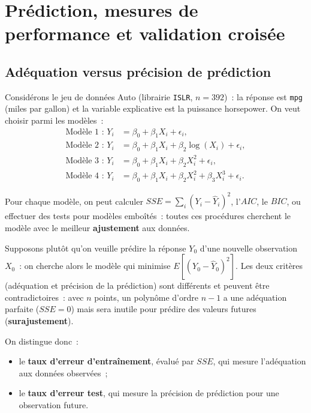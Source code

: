\documentclass[11pt,letterpaper]{article}
\begin{document}
\newpage
\section{Prédiction, mesures de performance et validation croisée}
\label{sec:cv}

\subsection{Adéquation versus précision de prédiction}

Considérons le jeu de données \textsf{Auto} (librairie \texttt{ISLR}, $n = 392$)~: la réponse est \texttt{mpg} (miles par gallon) et la variable explicative est la puissance \textsf{horsepower}. On veut choisir parmi les modèles~:
\begin{align*}
\mbox{Modèle 1~: } Y_i &= \beta_0 + \beta_1 X_i + \epsilon_i,\\
\mbox{Modèle 2~: } Y_i &= \beta_0 + \beta_1 X_i + \beta_2\log(X_i) + \epsilon_i,\\
\mbox{Modèle 3~: } Y_i &= \beta_0 + \beta_1 X_i + \beta_2 X_i^2 + \epsilon_i,\\
\mbox{Modèle 4~: } Y_i &= \beta_0 + \beta_1 X_i + \beta_2 X_i^2 + \beta_3 X_i^3 + \epsilon_i.
\end{align*}

Pour chaque modèle, on peut calculer $SSE = \sum_i(Y_i - \hat Y_i)^2$, l'$AIC$, le $BIC$, ou effectuer des tests pour modèles emboîtés~: toutes ces procédures cherchent le modèle avec le meilleur \textbf{ajustement} aux données.

Supposons plutôt qu'on veuille prédire la réponse $Y_0$ d'une nouvelle observation $X_0$~: on cherche alors le modèle qui minimise $E[(Y_0 - \hat Y_0)^2]$. Les deux critères (adéquation et précision de la prédiction) sont différents et peuvent être contradictoires~: avec $n$ points, un polynôme d'ordre $n-1$ a une adéquation parfaite ($SSE = 0$) mais sera inutile pour prédire des valeurs futures (\textbf{surajustement}).

On distingue donc~:
\begin{itemize}
\item le \textbf{taux d'erreur d'entraînement}, évalué par $SSE$, qui mesure l'adéquation aux données observées~;
\item le \textbf{taux d'erreur test}, qui mesure la précision de prédiction pour une observation future.
\end{itemize}
\end{document}
